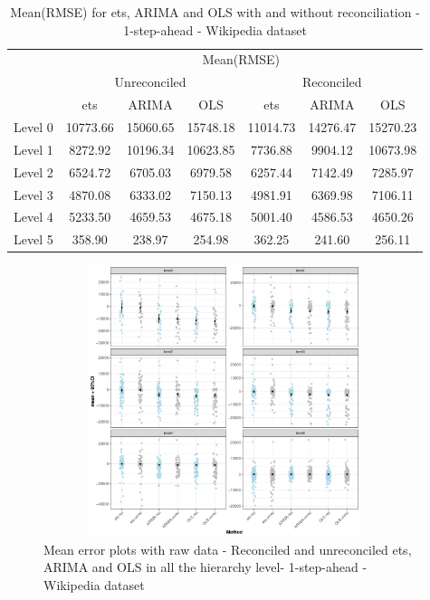 \documentclass[11pt,a4paper,]{article}
\begin{document}
\begin{table}[t]

\caption{\label{tab:wikipediadataresulrolling}Mean(RMSE) for ets, ARIMA and OLS with and without reconciliation - 1-step-ahead - Wikipedia dataset}
\centering
\begin{tabular}{ccccccc}
\toprule
\multicolumn{1}{c}{} & \multicolumn{6}{c}{Mean(RMSE)} \\
\cmidrule(l{2pt}r{2pt}){2-7}
\multicolumn{1}{c}{} & \multicolumn{3}{c}{Unreconciled} & \multicolumn{3}{c}{Reconciled} \\
\cmidrule(l{2pt}r{2pt}){2-4} \cmidrule(l{2pt}r{2pt}){5-7}
 & ets & ARIMA & OLS & ets & ARIMA & OLS\\
\midrule
Level 0 & 10773.66 & 15060.65 & 15748.18 & 11014.73 & 14276.47 & 15270.23\\
Level 1 & 8272.92 & 10196.34 & 10623.85 & 7736.88 & 9904.12 & 10673.98\\
Level 2 & 6524.72 & 6705.03 & 6979.58 & 6257.44 & 7142.49 & 7285.97\\
Level 3 & 4870.08 & 6333.02 & 7150.13 & 4981.91 & 6369.98 & 7106.11\\
Level 4 & 5233.50 & 4659.53 & 4675.18 & 5001.40 & 4586.53 & 4650.26\\
Level 5 & 358.90 & 238.97 & 254.98 & 362.25 & 241.60 & 256.11\\
\bottomrule
\end{tabular}
\end{table}

\begin{figure}

{\centering \includegraphics[width=400px,height=300px]{Paper-Figures/results_Wikipedia/boxplot_raw_data_1} 

}

\caption{Mean error plots with raw data -  Reconciled and unreconciled ets, ARIMA and OLS in all the hierarchy level- 1-step-ahead - Wikipedia dataset}\label{fig:errorplotrollingwiki}
\end{figure}
\end{document}
